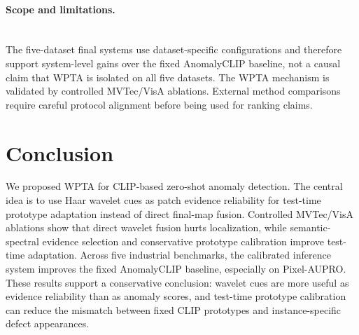 \documentclass[runningheads]{llncs}
\begin{document}
\paragraph{Scope and limitations.}\mbox{}\\
\noindent
The five-dataset final systems use dataset-specific configurations and therefore support system-level gains over the fixed AnomalyCLIP baseline, not a causal claim that WPTA is isolated on all five datasets. The WPTA mechanism is validated by controlled MVTec/VisA ablations. External method comparisons require careful protocol alignment before being used for ranking claims.

\section{Conclusion}

We proposed WPTA for CLIP-based zero-shot anomaly detection. The central idea is to use Haar wavelet cues as patch evidence reliability for test-time prototype adaptation instead of direct final-map fusion. Controlled MVTec/VisA ablations show that direct wavelet fusion hurts localization, while semantic-spectral evidence selection and conservative prototype calibration improve test-time adaptation. Across five industrial benchmarks, the calibrated inference system improves the fixed AnomalyCLIP baseline, especially on Pixel-AUPRO. These results support a conservative conclusion: wavelet cues are more useful as evidence reliability than as anomaly scores, and test-time prototype calibration can reduce the mismatch between fixed CLIP prototypes and instance-specific defect appearances.



\end{document}
